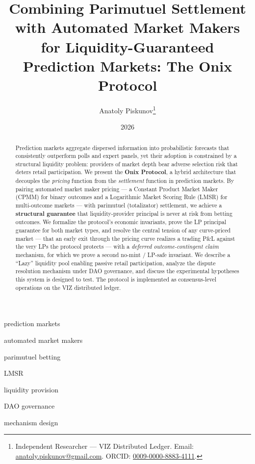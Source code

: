 \documentclass{ledger}
\title{Combining Parimutuel Settlement with Automated Market Makers for
Liquidity-Guaranteed Prediction Markets: The Onix Protocol}
\author{Anatoly Piskunov\thanks{Independent Researcher --- VIZ Distributed
Ledger. Email: \href{mailto:anatoly.piskunov@gmail.com}{anatoly.piskunov@gmail.com}.
ORCID: \href{https://orcid.org/0009-0000-8883-4111}{0009-0000-8883-4111}.}}
\date{2026}
\theoremstyle{plain}
\theoremstyle{remark}
\begin{document}
\maketitle

\begin{abstract}
Prediction markets aggregate dispersed information into probabilistic forecasts
that consistently outperform polls and expert panels, yet their adoption is
constrained by a structural liquidity problem: providers of market depth bear
adverse selection risk that deters retail participation. We present the
\textbf{Onix Protocol}, a hybrid architecture that decouples the \emph{pricing}
function from the \emph{settlement} function in prediction markets. By pairing
automated market maker pricing --- a Constant Product Market Maker (CPMM) for
binary outcomes and a Logarithmic Market Scoring Rule (LMSR) for multi-outcome
markets --- with parimutuel (totalizator) settlement, we achieve a
\textbf{structural guarantee} that liquidity-provider principal is never at risk
from betting outcomes. We formalize the protocol's economic invariants, prove
the LP principal guarantee for both market types, and resolve the central
tension of any curve-priced market --- that an early exit through the pricing
curve realizes a trading P\&L against the very LPs the protocol protects --- with
a \emph{deferred outcome-contingent claim} mechanism, for which we prove a
second no-mint / LP-safe invariant. We describe a ``Lazy'' liquidity pool
enabling passive retail participation, analyze the dispute resolution mechanism
under DAO governance, and discuss the experimental hypotheses this system is
designed to test. The protocol is implemented as consensus-level operations on
the VIZ distributed ledger.
\end{abstract}

\begin{keywords}
\item{prediction markets} \item{automated market makers} \item{parimutuel betting} \item{LMSR} \item{liquidity provision} \item{DAO governance} \item{mechanism design}
\end{keywords}

\clearpage
\tableofcontents
\clearpage

\end{document}
